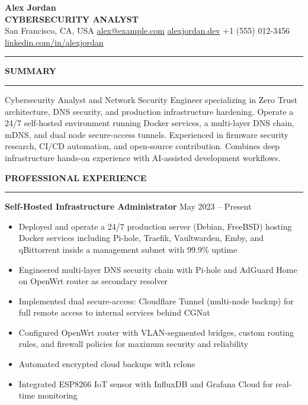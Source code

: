 \documentclass[10.5pt,a4paper]{article}
\begin{document}
  {\fontsize{26pt}{30pt}\selectfont\textbf{Alex Jordan}} \\[5pt]
  {\large\textbf{CYBERSECURITY ANALYST}} \\[5pt]
  {\small
    San Francisco, CA, USA \textbar{}
    \href{mailto:alex@example.com}{alex@example.com} \textbar{}
    \href{https://alexjordan.dev}{alexjordan.dev} \textbar{}
    +1 (555) 012-3456 \textbar{}
    \href{https://linkedin.com/in/alexjordan}{linkedin.com/in/alexjordan}
  }

\vspace{0pt}
\noindent\rule{\textwidth}{1.5pt}
\vspace{0pt}

\noindent\textbf{\large SUMMARY}\\[-6pt]
\noindent\rule{\textwidth}{0.5pt}

\vspace{2pt}
{\small Cybersecurity Analyst and Network Security Engineer specializing in Zero Trust architecture, DNS security, and production infrastructure hardening. Operate a 24/7 self-hosted environment running Docker services, a multi-layer DNS chain, mDNS, and dual node secure-access tunnels. Experienced in firmware security research, CI/CD automation, and open-source contribution. Combines deep infrastructure hands-on experience with AI-assisted development workflows.}

\vspace{10pt}

\noindent\textbf{\large PROFESSIONAL EXPERIENCE}\\[-6pt]
\noindent\rule{\textwidth}{0.5pt}

\vspace{5pt}
\noindent\textbf{Self-Hosted Infrastructure Administrator} \hfill {\small May 2023 -- Present}

\begin{itemize}\small
  \item Deployed and operate a 24/7 production server (Debian, FreeBSD) hosting Docker services including Pi-hole, Traefik, Vaultwarden, Emby, and qBittorrent inside a management subnet with 99.9\% uptime
  \item Engineered multi-layer DNS security chain with Pi-hole and AdGuard Home on OpenWrt router as secondary resolver
  \item Implemented dual secure-access: Cloudflare Tunnel (multi-node backup) for full remote access to internal services behind CGNat
  \item Configured OpenWrt router with VLAN-segmented bridges, custom routing rules, and firewall policies for maximum security and reliability
  \item Automated encrypted cloud backups with rclone
  \item Integrated ESP8266 IoT sensor with InfluxDB and Grafana Cloud for real-time monitoring
\end{itemize}
\end{document}
